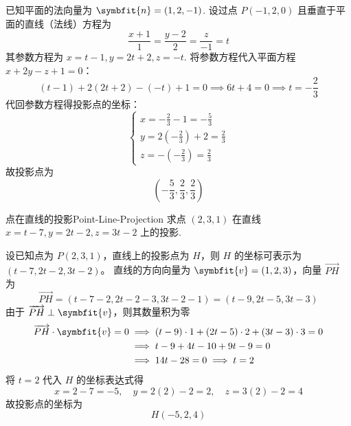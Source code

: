 \begin{solution}
    已知平面的法向量为 $\symbfit{n} = (1, 2, -1)$.
    设过点 $P(-1, 2, 0)$ 且垂直于平面的直线（法线）方程为
    \begin{equation*}
        \frac{x + 1}{1} = \frac{y - 2}{2} = \frac{z}{-1} = t
    \end{equation*}
    其参数方程为 $x = t - 1, y = 2t + 2, z = -t$.
    将参数方程代入平面方程 $x + 2y - z + 1 = 0$：
    \begin{equation*}
        (t - 1) + 2(2t + 2) - (-t) + 1 = 0 \implies 6t + 4 = 0 \implies t = -\frac{2}{3}
    \end{equation*}
    代回参数方程得投影点的坐标：
    \begin{equation*}
        \begin{cases} x = -\frac{2}{3} - 1 = -\frac{5}{3} \\ y = 2(-\frac{2}{3}) + 2 = \frac{2}{3} \\ z = -(-\frac{2}{3}) = \frac{2}{3} \end{cases}
    \end{equation*}
    故投影点为
    \begin{equation*}
        \boxed{\left( -\frac{5}{3}, \frac{2}{3}, \frac{2}{3} \right)}
    \end{equation*}
\end{solution}


\begin{problem}{点在直线的投影}{Point-Line-Projection}
    求点 $(2, 3, 1)$ 在直线 $x = t - 7, y = 2t - 2, z = 3t - 2$ 上的投影.
\end{problem}

\begin{solution}
    设已知点为 $P(2, 3, 1)$，直线上的投影点为 $H$，则 $H$ 的坐标可表示为 $(t - 7, 2t - 2, 3t - 2)$。
    直线的方向向量为 $\symbfit{v} = (1, 2, 3)$，向量 $\overrightarrow{PH}$ 为
    \begin{equation*}
        \overrightarrow{PH} = (t - 7 - 2, 2t - 2 - 3, 3t - 2 - 1) = (t - 9, 2t - 5, 3t - 3)
    \end{equation*}
    由于 $\overrightarrow{PH} \perp \symbfit{v}$，则其数量积为零
    \begin{equation*}
        \begin{aligned}
            \overrightarrow{PH} \cdot \symbfit{v} = 0
             & \implies (t - 9) \cdot 1 + (2t - 5) \cdot 2 + (3t - 3) \cdot 3 = 0 \\
             & \implies t - 9 + 4t - 10 + 9t - 9 = 0                              \\
             & \implies 14t - 28 = 0 \implies t = 2
        \end{aligned}
    \end{equation*}
    将 $t = 2$ 代入 $H$ 的坐标表达式得
    \begin{equation*}
        x = 2 - 7 = -5, \quad y = 2(2) - 2 = 2, \quad z = 3(2) - 2 = 4
    \end{equation*}
    故投影点的坐标为
    \begin{equation*}
        \boxed{H(-5, 2, 4)}
    \end{equation*}
\end{solution}


